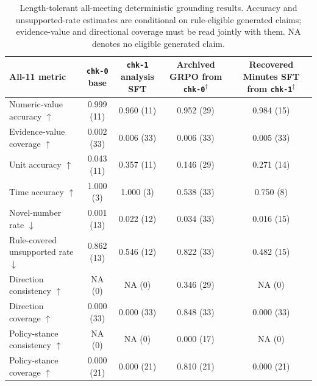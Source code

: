 \begin{table}[htbp]
    \centering
    \scriptsize
    \begin{tabular}{p{} c c c c}
        \toprule
        \textbf{All-11 metric} &
        \makecell[c]{\texttt{chk-0}\\base} &
        \makecell[c]{\texttt{chk-1}\\analysis SFT} &
        \makecell[c]{Archived GRPO\\from \texttt{chk-0}$^{\dagger}$} &
        \makecell[c]{Recovered Minutes SFT\\from \texttt{chk-1}$^{\ddagger}$} \\
        \midrule
        Numeric-value accuracy $\uparrow$ & 0.999 (11) & 0.960 (11) & 0.952 (29) & 0.984 (15) \\
        Evidence-value coverage $\uparrow$ & 0.002 (33) & 0.006 (33) & 0.006 (33) & 0.005 (33) \\
        Unit accuracy $\uparrow$ & 0.043 (11) & 0.357 (11) & 0.146 (29) & 0.271 (14) \\
        Time accuracy $\uparrow$ & 1.000 (3) & 1.000 (3) & 0.538 (33) & 0.750 (8) \\
        Novel-number rate $\downarrow$ & 0.001 (13) & 0.022 (12) & 0.034 (33) & 0.016 (15) \\
        Rule-covered unsupported rate $\downarrow$ & 0.862 (13) & 0.546 (12) & 0.822 (33) & 0.482 (15) \\
        Direction consistency $\uparrow$ & NA (0) & NA (0) & 0.346 (29) & NA (0) \\
        Direction coverage $\uparrow$ & 0.000 (33) & 0.000 (33) & 0.848 (33) & 0.000 (33) \\
        Policy-stance consistency $\uparrow$ & NA (0) & NA (0) & 0.000 (17) & NA (0) \\
        Policy-stance coverage $\uparrow$ & 0.000 (21) & 0.000 (21) & 0.810 (21) & 0.000 (21) \\
        \bottomrule
    \end{tabular}
    \caption{Length-tolerant all-meeting deterministic grounding results.
    Accuracy and unsupported-rate estimates are conditional on rule-eligible
    generated claims; evidence-value and directional coverage must be read
    jointly with them. NA denotes no eligible generated claim.}
    \label{tab:ch2:common_test_length_tolerant_grounding}
\end{table}

